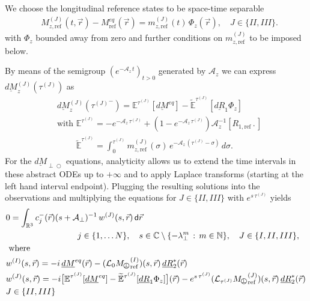 \documentclass{ws-m3as}
\newcommand{\uld}[1]{\underline{d#1}}
\def\Mpp{M_{\perp\!\!\!\!\!\bigcirc}}
\def\uldMpp{\uld{M}_{\perp\!\!\!\!\!\bigcirc}}
\begin{document}
We choose the longitudinal reference states to be space-time separable
\begin{equation}\label{spacetime-sep}
\begin{aligned}
&M_{z,\text{ref}}^{(J)}(t, \vec r)-M^{eq}_{\text{ref}}(\vec r)=m_{z,\text{ref}}^{(J)}(t)\, \Phi_z(\vec r), \quad J\in\{II,III\}.
\end{aligned}
\end{equation} 
with 
$\Phi_z$ bounded away from zero and further conditions on 
$m_{z,\text{ref}}^{(J)}$ to be imposed below.

By means of the semigroup $(e^{-\mathcal{A}_z\,t})_{t>0}$ generated by $\mathcal{A}_z$ we can express $\uld{M}_z^{(J)}(\tau^{(J)})$ as 
\[
\begin{aligned}
&\uld{M}_z^{(J)}({\tau^{(J)}}^-)
=\mathbb{E}^{\tau^{(J)}}[\uld{M}^{eq}]-\widetilde{\mathbb{E}}^{\tau^{(J)}}[\uld{R}_1 \Phi_z]\\
&\text{with }\mathbb{E}^{\tau^{(J)}}=-e^{-\mathcal{A}_z\,\tau^{(J)}}+(1-e^{-\mathcal{A}_z\,\tau^{(J)}})\mathcal{A}_z^{-1}[R_{1,\text{ref}}\,.\,] \\
&\phantom{\text{with }}\widetilde{\mathbb{E}}^{\tau^{(J)}}
=\int_0^{\tau^{(J)}} m_{z,\text{ref}}^{(J)}(\sigma)\,e^{-\mathcal{A}_z\,(\tau^{(J)}-\sigma)}\, d\sigma.
\end{aligned}
\]
For the $\uldMpp$ equations, analyticity allows us to extend the time intervals in these abstract ODEs up to $+\infty$ and to apply Laplace transforms (starting at the left hand interval endpoint). Plugging the resulting solutions into the observations 
and multiplying the equations for $J\in\{II,III\}$ with $e^{s\,\tau^{(J)}}$ yields
\[
\begin{aligned}
&0=\int_{\mathbb{R}^3} c^-_j(\vec r) (s+\mathcal{A}_\perp)^{-1} \, w^{(J)}(s,\vec r) \,\textsf{d}\vec r
\\&\hspace*{3cm}
j\in\{1,\ldots N\}, \quad s\in\mathbb{C}\setminus\{-\lambda_\perp^m\,:\,m\in\mathbb{N}\}, \quad J\in\{I,II,III\}, \\
&\text{ where } \\
&w^{(I)}(s,\vec r)=-i\,\uld{M}^{eq}(\vec r)
-(\mathcal{L}_0{\Mpp}_{\text{ref}}^{(I)})(s, \vec r)\,\uld{R}_2^*(\vec r)\\
&w^{(J)}(s,\vec r)=
-i\bigl[\mathbb{E}^{\tau^{(J)}}[\uld{M}^{eq}]-\widetilde{\mathbb{E}}^{\tau^{(J)}}[\uld{R}_1 \Phi_z]\bigr](\vec r)
-e^{s\,\tau^{(J)}}(\mathcal{L}_{\tau^{(J)}}{\Mpp}_{\text{ref}}^{(J)})(s, \vec r)\,\uld{R}_2^*(\vec r)
\\& J\in\{II,III\}
 \end{aligned}
\]
\end{document}
